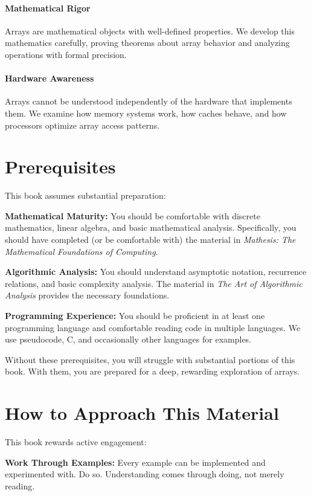 \paragraph{Mathematical Rigor}
Arrays are mathematical objects with well-defined properties. We develop this mathematics carefully, proving theorems about array behavior and analyzing operations with formal precision.

\paragraph{Hardware Awareness}
Arrays cannot be understood independently of the hardware that implements them. We examine how memory systems work, how caches behave, and how processors optimize array access patterns.

\section*{Prerequisites}

This book assumes substantial preparation:

\textbf{Mathematical Maturity:} You should be comfortable with discrete mathematics, linear algebra, and basic mathematical analysis. Specifically, you should have completed (or be comfortable with) the material in \textit{Mathesis: The Mathematical Foundations of Computing}.

\textbf{Algorithmic Analysis:} You should understand asymptotic notation, recurrence relations, and basic complexity analysis. The material in \textit{The Art of Algorithmic Analysis} provides the necessary foundations.

\textbf{Programming Experience:} You should be proficient in at least one programming language and comfortable reading code in multiple languages. We use pseudocode, C, and occasionally other languages for examples.

Without these prerequisites, you will struggle with substantial portions of this book. With them, you are prepared for a deep, rewarding exploration of arrays.

\section*{How to Approach This Material}

This book rewards active engagement:

\textbf{Work Through Examples:} Every example can be implemented and experimented with. Do so. Understanding comes through doing, not merely reading.

